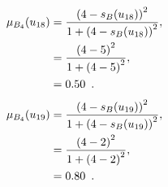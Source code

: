 \documentclass[a4paper,openany]{book}
\begin{document}
				\begin{align}
					\mu_{B_4}(u_{18}) &= \frac{\left(4-s_B(u_{18})\right)^2}{1 + \left(4-s_B(u_{18})\right)^2} ,\\
					&= \frac{\left(4-5\right)^2}{1 + \left(4-5\right)^2} \notag ,\\
					&= 0.50 \enspace. \notag
				\end{align}
				\begin{align}
					\mu_{B_4}(u_{19}) &= \frac{\left(4-s_B(u_{19})\right)^2}{1 + \left(4-s_B(u_{19})\right)^2} ,\\
					&= \frac{\left(4-2\right)^2}{1 + \left(4-2\right)^2} \notag ,\\
					&= 0.80 \enspace. \notag
				\end{align}
\end{document}
